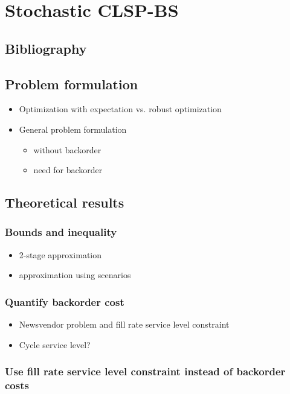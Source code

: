\chapter{Stochastic CLSP-BS}


\section{Bibliography}


\section{Problem formulation}

\begin{itemize}
  \item Optimization with expectation vs. robust optimization
  \item General problem formulation
  \begin{itemize}
    \item without backorder
    \item need for backorder
  \end{itemize}
\end{itemize}


\section{Theoretical results}

\subsection{Bounds and inequality}

\begin{itemize}
  \item 2-stage approximation
  \item approximation using scenarios
\end{itemize}


\subsection{Quantify backorder cost}

\begin{itemize}
  \item Newsvendor problem and fill rate service level constraint
  \item Cycle service level?
\end{itemize}


\subsection{Use fill rate service level constraint instead of backorder costs}
